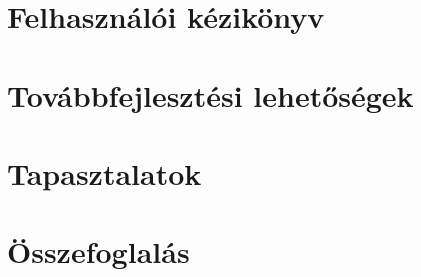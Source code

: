 \chapter{Felhasználói kézikönyv}
\pagestyle{main}
%


\chapter{Továbbfejlesztési lehetőségek}
\pagestyle{main}



\chapter{Tapasztalatok}
\pagestyle{main}




\chapter*{Összefoglalás}\label{ch:osszefoglalas}
\pagestyle{plain}


\newpage








